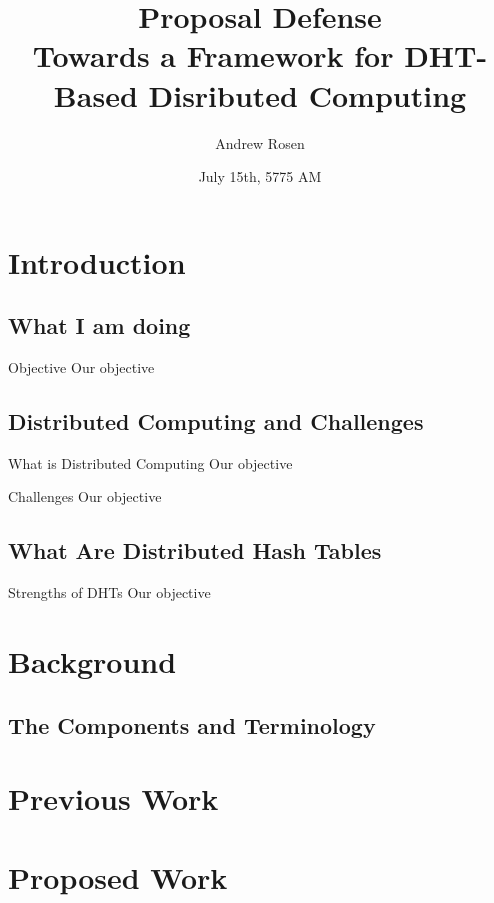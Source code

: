 \documentclass[11pt]{beamer}
\author{Andrew Rosen}
\title[DHT Based Distributed Computing]{Proposal Defense\\ Towards a Framework for DHT-Based Disributed Computing}
\institute{Georgia State University}
\date{July 15th, 5775 AM}
\begin{document}
\maketitle

\begin{frame}
	\frametitle{}
\end{frame}


\section{Introduction}


\subsection{What I am doing}
\begin{frame}{Objective}
Our objective

\end{frame}

\subsection{Distributed Computing and Challenges}

\begin{frame}{What is Distributed Computing}
	Our objective
	
\end{frame}


\begin{frame}{Challenges}
	Our objective
	
\end{frame}


\subsection{What Are Distributed Hash Tables}

\begin{frame}{Strengths of DHTs }
	Our objective
	
\end{frame}


\section{Background}

\subsection{The Components and Terminology}


\section{Previous Work}

\section{Proposed Work}
\end{document}
